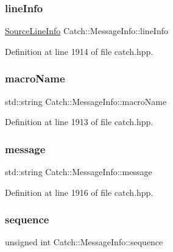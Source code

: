 \subsubsection{\texorpdfstring{line\+Info}{lineInfo}}
{\footnotesize\ttfamily \hyperlink{struct_catch_1_1_source_line_info}{Source\+Line\+Info} Catch\+::\+Message\+Info\+::line\+Info}



Definition at line 1914 of file catch.\+hpp.

\hypertarget{struct_catch_1_1_message_info_a156ade4b3cc731f6ec7b542ae47ba8e3}{}\label{struct_catch_1_1_message_info_a156ade4b3cc731f6ec7b542ae47ba8e3} 
\subsubsection{\texorpdfstring{macro\+Name}{macroName}}
{\footnotesize\ttfamily std\+::string Catch\+::\+Message\+Info\+::macro\+Name}



Definition at line 1913 of file catch.\+hpp.

\hypertarget{struct_catch_1_1_message_info_ab6cd06e050bf426c6577502a5c50e256}{}\label{struct_catch_1_1_message_info_ab6cd06e050bf426c6577502a5c50e256} 
\subsubsection{\texorpdfstring{message}{message}}
{\footnotesize\ttfamily std\+::string Catch\+::\+Message\+Info\+::message}



Definition at line 1916 of file catch.\+hpp.

\hypertarget{struct_catch_1_1_message_info_a7f4f57ea21e50160adefce7b68a781d6}{}\label{struct_catch_1_1_message_info_a7f4f57ea21e50160adefce7b68a781d6} 
\subsubsection{\texorpdfstring{sequence}{sequence}}
{\footnotesize\ttfamily unsigned int Catch\+::\+Message\+Info\+::sequence}



